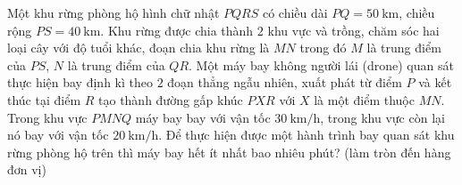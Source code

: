 \begin{ex}
Một khu rừng phòng hộ hình chữ nhật $PQRS$ có chiều dài $PQ=50\ \mathrm{km}$, chiều rộng $PS=40\ \mathrm{km}$. Khu rừng được chia thành $2$ khu vực và trồng, chăm sóc hai loại cây với độ tuổi khác, đoạn chia khu rừng là $MN$ trong đó $M$ là trung điểm của $PS$, $N$ là trung điểm của $QR$. Một máy bay không người lái (drone) quan sát thực hiện bay định kì theo $2$ đoạn thẳng ngẫu nhiên, xuất phát từ điểm $P$ và kết thúc tại điểm $R$ tạo thành đường gấp khúc $PXR$ với $X$ là một điểm thuộc $MN$. Trong khu vực $PMNQ$ máy bay bay với vận tốc $30\ \mathrm{km/h}$, trong khu vực còn lại nó bay với vận tốc $20\ \mathrm{km/h}$. Để thực hiện được một hành trình bay quan sát khu rừng phòng hộ trên thì máy bay hết ít nhất bao nhiêu phút? (làm tròn đến hàng đơn vị)
\begin{center}
\end{center}
\end{ex}
